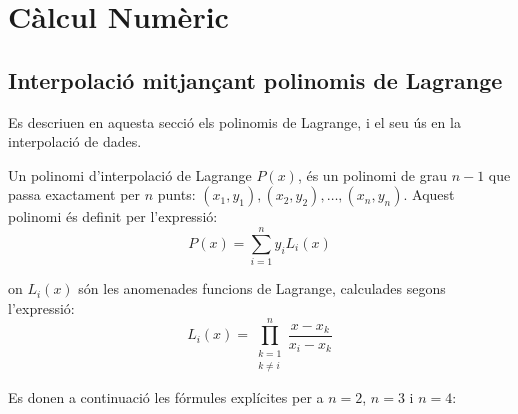
\chapter{Càlcul Numèric}\label{sec:ch-calc-num}

\section{Interpolació mitjançant polinomis de Lagrange}
\label{sec:poli_lagr}

Es descriuen en aquesta secció els polinomis de Lagrange, i el seu ús en la interpolació de dades.

Un polinomi d'interpolació de Lagrange $P(x)$, és un polinomi de grau $n-1$ que passa exactament per $n$ punts:
$(x_1, y_1), (x_2, y_2), \dots, (x_n, y_n)$. Aquest polinomi és definit per l'expressió:
\begin{equation}
  P(x) = \sum_{i=1}^{n}  y_i L_i(x) \label{eq:poly_lag_1}
\end{equation}

on $L_i(x)$ són les anomenades funcions de Lagrange, calculades segons l'expressió:
\begin{equation}
  L_i(x) = \prod_{\substack{k=1 \\ k\neq i}}^{n} \frac{x-x_k}{x_i-x_k} \label{eq:poly_lag_2}
\end{equation}

Es donen a continuació les fórmules explícites per a $n = 2$, $n=3$ i $n=4$:

